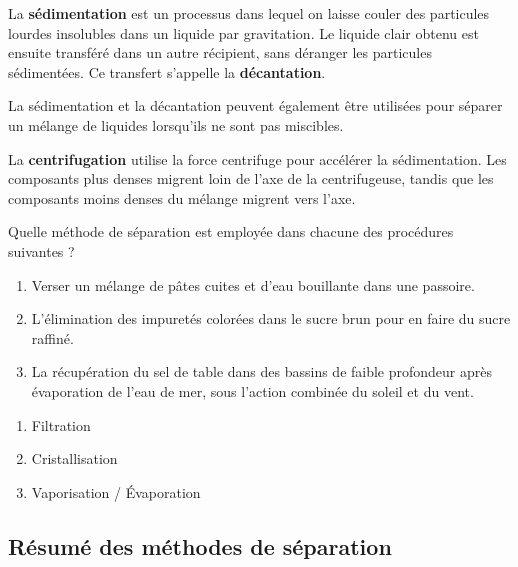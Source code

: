 \documentclass[
  11pt,
  french,
  a4paper,
  openany]{book}
\providecommand{\tightlist}{%
  \setlength{\itemsep}{0pt}\setlength{\parskip}{0pt}}
\begin{document}
La \textbf{sédimentation} est un processus dans lequel on laisse couler des particules lourdes insolubles dans un liquide par gravitation. Le liquide clair obtenu est ensuite transféré dans un autre récipient, sans déranger les particules sédimentées. Ce transfert s'appelle la \textbf{décantation}.

La sédimentation et la décantation peuvent également être utilisées pour séparer un mélange de liquides lorsqu'ils ne sont pas miscibles.

La \textbf{centrifugation} utilise la force centrifuge pour accélérer la sédimentation. Les composants plus denses migrent loin de l'axe de la centrifugeuse, tandis que les composants moins denses du mélange migrent vers l'axe.

\newpage

\begin{Exercise}

Quelle méthode de séparation est employée dans chacune des procédures suivantes ?

\begin{enumerate}
\def\labelenumi{\arabic{enumi}.}
\tightlist
\item
  Verser un mélange de pâtes cuites et d'eau bouillante dans une passoire.
\item
  L'élimination des impuretés colorées dans le sucre brun pour en faire du sucre raffiné.
\item
  La récupération du sel de table dans des bassins de faible profondeur après évaporation de l'eau de mer, sous l'action combinée du soleil et du vent.
\end{enumerate}


\end{Exercise}

\begin{Answer}

\begin{enumerate}
\def\labelenumi{\arabic{enumi}.}
\tightlist
\item
  Filtration
\item
  Cristallisation
\item
  Vaporisation / Évaporation
\end{enumerate}


\end{Answer}

\hypertarget{ruxe9sumuxe9-des-muxe9thodes-de-suxe9paration}{%
\subsection{Résumé des méthodes de séparation}\label{ruxe9sumuxe9-des-muxe9thodes-de-suxe9paration}}
\end{document}
